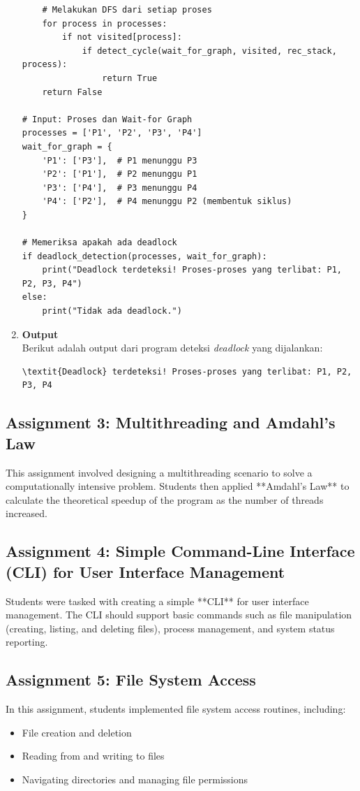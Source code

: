 \documentclass[12pt]{article}
\begin{document}
\begin{enumerate}[label=\alph*.]
\begin{lstlisting}
    # Melakukan DFS dari setiap proses
    for process in processes:
        if not visited[process]:
            if detect_cycle(wait_for_graph, visited, rec_stack, process):
                return True
    return False

# Input: Proses dan Wait-for Graph
processes = ['P1', 'P2', 'P3', 'P4']
wait_for_graph = {
    'P1': ['P3'],  # P1 menunggu P3
    'P2': ['P1'],  # P2 menunggu P1
    'P3': ['P4'],  # P3 menunggu P4
    'P4': ['P2'],  # P4 menunggu P2 (membentuk siklus)
}

# Memeriksa apakah ada deadlock
if deadlock_detection(processes, wait_for_graph):
    print("Deadlock terdeteksi! Proses-proses yang terlibat: P1, P2, P3, P4")
else:
    print("Tidak ada deadlock.")
\end{lstlisting}

\item \textbf{Output} \\
Berikut adalah output dari program deteksi \textit{ deadlock} yang dijalankan:
\begin{verbatim}
\textit{Deadlock} terdeteksi! Proses-proses yang terlibat: P1, P2, P3, P4
\end{verbatim}
\end{enumerate}

\subsection{Assignment 3: Multithreading and Amdahl's Law}
This assignment involved designing a multithreading scenario to solve a computationally intensive problem. Students then applied **Amdahl's Law** to calculate the theoretical speedup of the program as the number of threads increased.

\subsection{Assignment 4: Simple Command-Line Interface (CLI) for User Interface Management}
Students were tasked with creating a simple **CLI** for user interface management. The CLI should support basic commands such as file manipulation (creating, listing, and deleting files), process management, and system status reporting.

\subsection{Assignment 5: File System Access}
In this assignment, students implemented file system access routines, including:
\begin{itemize}
    \item File creation and deletion
    \item Reading from and writing to files
    \item Navigating directories and managing file permissions
\end{itemize}
\end{document}
